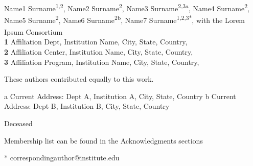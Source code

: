 \documentclass[
  10pt,
  letterpaper,
]{article}
\begin{document}
\vspace*{0.2in}

\begin{flushleft}
{\Large
\textbf{} %
}
\newline
\\
Name1 Surname\textsuperscript{1,2\Yinyang}, Name2
Surname\textsuperscript{2\Yinyang}, Name3
Surname\textsuperscript{2,3\textcurrency a}, Name4
Surname\textsuperscript{2}, Name5 Surname\textsuperscript{2\dag}, Name6
Surname\textsuperscript{2\textcurrency b}, Name7
Surname\textsuperscript{1,2,3*}, with the Lorem Ipsum
Consortium\textsuperscript{\textpilcrow}
\\
\bigskip
\textbf{1} Affiliation Dept, Institution
Name, City, State, Country, \\ \textbf{2} Affiliation Center,
Institution Name, City, State, Country, \\ \textbf{3} Affiliation
Program, Institution Name, City, State, Country, 
\bigskip

% 
%
\Yinyang These authors contributed equally to this work.


\textcurrency a Current Address: Dept A, Institution A, City, State,
Country
\textcurrency b Current Address: Dept B, Institution B, City, State,
Country

\dag Deceased

\textpilcrow Membership list can be found in the Acknowledgments
sections

* correspondingauthor@institute.edu

\end{flushleft}
\end{document}
